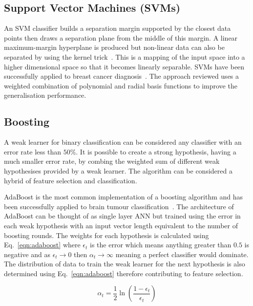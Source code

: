 \documentclass[journal]{IEEEtran}
\begin{document}
\subsection{Support Vector Machines (SVMs)}
An SVM classifier builds a separation margin supported by the closest data points then draws a separation plane from the middle of this margin.
A linear maximum-margin hyperplane is produced but non-linear data can also be separated by using the kernel trick~\cite{cortes95support}. 
This is a mapping of the input space into a higher dimensional space so that it becomes linearly separable.
SVMs have been successfully applied to breast cancer diagnosis~\cite{xiufeng13svm}.
The approach reviewed uses a weighted combination of polynomial and radial basis functions to improve the generalisation performance.



\subsection{Boosting}
A weak learner for binary classification can be considered any classifier with an error rate less than $50$\%.
It is possible to create a strong hypothesis, having a much smaller error rate, by combing the weighted sum of different weak hypothesises provided by a weak learner. 
The algorithm can be considered a hybrid of feature selection and classification.

AdaBoost is the most common implementation of a boosting algorithm and has been successfully applied to brain tumour classification~\cite{freund99boost,islam13multi}.
The architecture of AdaBoost can be thought of as single layer ANN but trained using the error in each weak hypothesis with an input vector length equivalent to the number of boosting rounds.
The weights for each hypothesis is calculated using Eq.~\eqref{eqn:adaboost} where $\epsilon_t$ is the error which means anything greater than $0.5$ is negative and as $\epsilon_t \to 0$ then $\alpha_t \to \infty$ meaning a perfect classifier would dominate.
The distribution of data to train the weak learner for the next hypothesis is also determined using Eq.~\eqref{eqn:adaboost} therefore contributing to feature selection.


\begin{equation}
	\alpha_t = \frac{1}{2}\ln\left(\frac{1 - \epsilon_t}{\epsilon_t}\right)
	\label{eqn:adaboost}
\end{equation}
\end{document}
